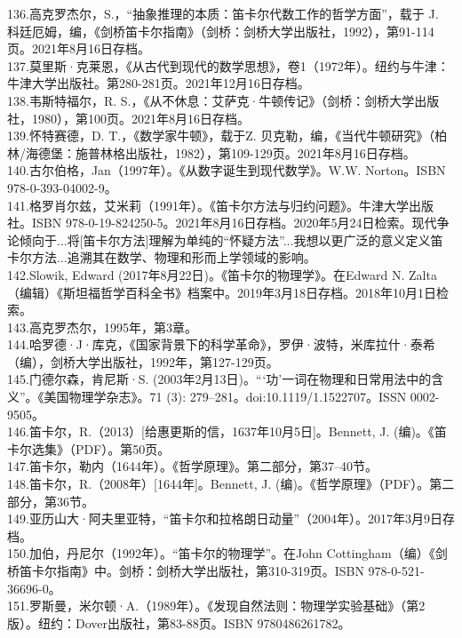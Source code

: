136.高克罗杰尔，S.，“抽象推理的本质：笛卡尔代数工作的哲学方面”，载于 J. 科廷厄姆，编，《剑桥笛卡尔指南》（剑桥：剑桥大学出版社，1992），第91-114页。2021年8月16日存档。\\
137.莫里斯·克莱恩，《从古代到现代的数学思想》，卷1（1972年）。纽约与牛津：牛津大学出版社。第280-281页。2021年12月16日存档。\\
138.韦斯特福尔，R. S.，《从不休息：艾萨克·牛顿传记》（剑桥：剑桥大学出版社，1980），第100页。2021年8月16日存档。\\
139.怀特赛德，D. T.，《数学家牛顿》，载于Z. 贝克勒，编，《当代牛顿研究》（柏林/海德堡：施普林格出版社，1982），第109-129页。2021年8月16日存档。\\
140.古尔伯格，Jan（1997年）。《从数字诞生到现代数学》。W.W. Norton。ISBN 978-0-393-04002-9。\\
141.格罗肖尔兹，艾米莉（1991年）。《笛卡尔方法与归约问题》。牛津大学出版社。ISBN 978-0-19-824250-5。2021年8月16日存档。2020年5月24日检索。现代争论倾向于...将[笛卡尔方法]理解为单纯的“怀疑方法”...我想以更广泛的意义定义笛卡尔方法...追溯其在数学、物理和形而上学领域的影响。\\
142.Slowik, Edward (2017年8月22日)。《笛卡尔的物理学》。在Edward N. Zalta（编辑）《斯坦福哲学百科全书》档案中。2019年3月18日存档。2018年10月1日检索。\\
143.高克罗杰尔，1995年，第3章。\\
144.哈罗德·J·库克，《国家背景下的科学革命》，罗伊·波特，米库拉什·泰希（编），剑桥大学出版社，1992年，第127-129页。\\
145.门德尔森，肯尼斯·S. (2003年2月13日)。“‘功’一词在物理和日常用法中的含义”。《美国物理学杂志》。71 (3): 279–281。doi:10.1119/1.1522707。ISSN 0002-9505。\\
146.笛卡尔，R.（2013）[给惠更斯的信，1637年10月5日]。Bennett, J. (编)。《笛卡尔选集》（PDF）。第50页。\\
147.笛卡尔，勒内（1644年）。《哲学原理》。第二部分，第37–40节。\\
148.笛卡尔，R.（2008年）[1644年]。Bennett, J. (编)。《哲学原理》（PDF）。第二部分，第36节。\\
149.亚历山大·阿夫里亚特，“笛卡尔和拉格朗日动量”（2004年）。2017年3月9日存档。\\
150.加伯，丹尼尔（1992年）。“笛卡尔的物理学”。在John Cottingham（编）《剑桥笛卡尔指南》中。剑桥：剑桥大学出版社，第310-319页。ISBN 978-0-521-36696-0。\\
151.罗斯曼，米尔顿·A.（1989年）。《发现自然法则：物理学实验基础》（第2版）。纽约：Dover出版社，第83-88页。ISBN 9780486261782。\\
